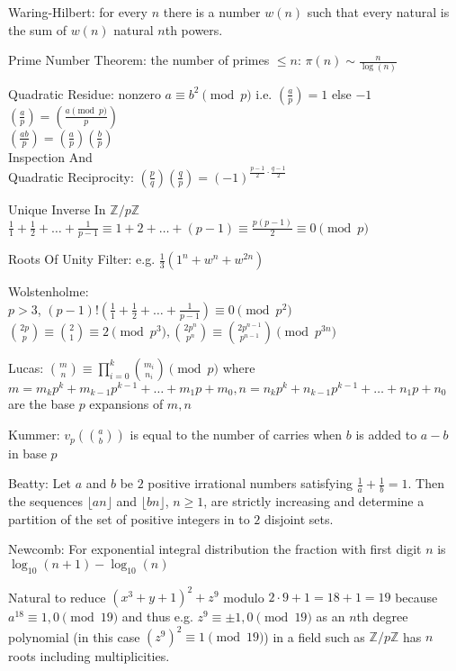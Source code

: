 Waring-Hilbert: for every $n$ there is a number $w(n)$ such that every natural is the sum of $w(n)$ natural $n$th powers.

Prime Number Theorem: the number of primes $\le n$: $\pi (n) \sim \frac{n}{\log(n)}$

Quadratic Residue: nonzero $a \equiv b^2 \pmod{p}$ i.e. $\left(\frac{a}{p} \right) = 1$ else $-1$ \\
$\left(\frac{a}{p} \right) = \left(\frac{a \pmod{p}}{p} \right)$ \\
$\left(\frac{ab}{p} \right) = \left(\frac{a}{p} \right) \left(\frac{b}{p} \right)$ \\
Inspection And \\
Quadratic Reciprocity: $\left(\frac{p}{q} \right) \left(\frac{q}{p} \right) = (-1)^{\frac{p-1}{2} \cdot \frac{q-1}{2}}$

Unique Inverse In $\mathbb{Z}/p \mathbb{Z}$ \\
$\frac{1}{1}+\frac{1}{2}+\dots+\frac{1}{p-1} \equiv 1+2+\dots+(p-1) \equiv \frac{p(p-1)}{2} \equiv 0 \pmod{p}$

Roots Of Unity Filter: e.g. $\frac{1}{3}(1^n+w^n+w^{2n})$

Wolstenholme: \\
$p>3$, $(p-1)!\left(\frac{1}{1}+\frac{1}{2}+\dots+\frac{1}{p-1} \right) \equiv 0 \pmod{p^2}$ \\
$\binom{2p}{p} \equiv \binom{2}{1} \equiv 2 \pmod{p^3}, \binom{2p^n}{p^n} \equiv \binom{2p^{n-1}}{p^{n-1}} \pmod {p^{3n}}$

Lucas: $\binom{m}{n} \equiv \prod_{i=0}^k \binom{m_i}{n_i} \pmod{p}$ where $m=m_k p^k+m_{k-1} p^{k-1} + \dots + m_1 p + m_0,n=n_k p^k+n_{k-1} p^{k-1} + \dots + n_1 p + n_0$ are the base $p$ expansions of $m,n$

Kummer: $v_p \left(\binom{a}{b} \right)$ is equal to the number of carries when $b$ is added to $a-b$ in base $p$

Beatty: Let $a$ and $b$ be $2$ positive irrational numbers satisfying $\frac{1}{a}+\frac{1}{b}=1$. Then the sequences $\lfloor an \rfloor$ and $\lfloor bn \rfloor$, $n \ge 1$, are strictly increasing and determine a partition of the set of positive integers in to $2$ disjoint sets.

Newcomb: For exponential integral distribution the fraction with first digit $n$ is $\log_{10}(n+1)-\log_{10}(n)$

Natural to reduce $(x^3+y+1)^2+z^9$ modulo $2 \cdot 9+1=18+1=19$ because $a^{18} \equiv 1,0 \pmod{19}$ and thus e.g. $z^9 \equiv \pm 1,0 \pmod{19}$ as an $n$th degree polynomial (in this case $(z^9)^2 \equiv 1 \pmod{19}$) in a field such as $\mathbb{Z}/p\mathbb{Z}$ has $n$ roots including multiplicities.

